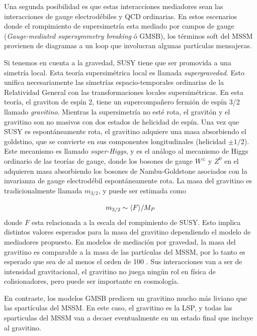 Una segunda posibilidad es que estas interacciones mediadores sean las
interacciones de gauge electrodébiles y QCD ordinarias. En estos escenarios
donde el rompimiento de supersimetría esta mediado por campos de gauge
(\emph{Gauge-mediated supersymmetry breaking} ó GMSB), los términos soft del
MSSM provienen de diagramas a un loop que involucran algunas partículas
mensajeras.

Si tenemos en cuenta a la gravedad, SUSY tiene que ser promovida a una simetría
local. Esta teoría supersimétrica local es llamada \emph{supergravedad}. Esto
unifica necesariamente las simetrías espacio-temporales ordinarias de la
Relatividad General con las transformaciones locales supersimétricas. En esta
teoría, el graviton de espín 2, tiene un supercompa\~nero fermión de espín 3/2
llamado \emph{gravitino}. Mientras la supersimetría no esté rota, el gravitón y
el gravitino son no masivos con dos estados de helicidad de espín. Una vez que
SUSY es espontáneamente rota, el gravitino adquiere una masa absorbiendo el
goldstino, que se convierte en sus componentes longitudinales (helicidad $\pm
1/2$). Este mecanismo es llamado \emph{super-Higgs}, y es el análogo al
mecanismo de Higgs ordinario de las teorías de gauge, donde los bosones de gauge
$W^\pm$ y $Z^0$ en el {\SM} adquieren masa absorbiendo los bosones de
Nambu-Goldstone asociados con la invarianza de gauge electrodébil
espontáneamente rota. La masa del gravitino es tradicionalmente llamada
$m_{3/2}$, y puede ser estimada como

\begin{equation}
  m_{3/2} \sim \langle F \rangle / M_P
\end{equation}
%
donde $F$ esta relacionada a la escala del rompimiento de SUSY. Esto implica
distintos valores esperados para la masa del gravitino dependiendo el modelo de
mediadores propuesto. En modelos de mediación por gravedad, la masa del
gravitino es comparable a la masa de las partículas del MSSM, por lo tanto es
esperado que sea de al menos el orden de 100 \gev. Sus interacciones van a ser
de intensidad gravitacional, el gravitino no juega ningún rol en física de
colisionadores, pero puede ser importante en cosmología.

En contraste, los modelos GMSB predicen un gravitino mucho más liviano que las
spartículas del MSSM.%
En este caso, el gravitino es
la LSP, y todas las sparticulas del MSSM van a decaer eventualmente en un estado
final que incluye al gravitino.


